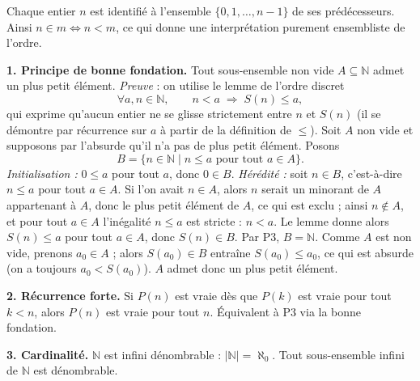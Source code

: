 Chaque entier $n$ est identifié à l'ensemble $\{0,1,\ldots,n-1\}$ de ses
prédécesseurs. Ainsi $n \in m \Leftrightarrow n < m$, ce qui donne une
interprétation purement ensembliste de l'ordre.

\decsep{}



\begin{mdframed}[style=exbar]
  \textbf{1. Principe de bonne fondation.}\enspace%
  Tout sous-ensemble non vide $A \subseteq \mathbb{N}$ admet un plus petit élément.
  \textit{Preuve} : on utilise le lemme de l'ordre discret
  \[
    \forall a,n\in\mathbb{N},\qquad n < a \;\Longrightarrow\; S(n) \leq a,
  \]
  qui exprime qu'aucun entier ne se glisse strictement entre $n$ et $S(n)$
  (il se démontre par récurrence sur $a$ à partir de la définition de $\leq$).
  Soit $A$ non vide et supposons par l'absurde qu'il n'a pas de plus petit
  élément. Posons
  \[
    B = \{n\in\mathbb{N} \mid n \leq a \text{ pour tout } a\in A\}.
  \]
  \emph{Initialisation :} $0 \leq a$ pour tout $a$, donc $0\in B$.
  \emph{Hérédité :} soit $n\in B$, c'est-à-dire $n\leq a$ pour tout $a\in A$.
  Si l'on avait $n\in A$, alors $n$ serait un minorant de $A$ appartenant à $A$,
  donc le plus petit élément de $A$, ce qui est exclu ; ainsi $n\notin A$,
  et pour tout $a\in A$ l'inégalité $n\leq a$ est stricte : $n<a$.
  Le lemme donne alors $S(n)\leq a$ pour tout $a\in A$, donc $S(n)\in B$.
  Par P3, $B = \mathbb{N}$. Comme $A$ est non vide, prenons $a_0\in A$ ;
  alors $S(a_0)\in B$ entraîne $S(a_0)\leq a_0$, ce qui est absurde
  (on a toujours $a_0 < S(a_0)$). $A$ admet donc un plus petit élément.

  \smallskip\noindent
  \textbf{2. Récurrence forte.}\enspace%
  Si $P(n)$ est vraie dès que $P(k)$ est vraie pour tout $k < n$,
  alors $P(n)$ est vraie pour tout $n$. Équivalent à P3 via la bonne fondation.

  \smallskip\noindent
  \textbf{3. Cardinalité.}\enspace%
  $\mathbb{N}$ est infini dénombrable : $|\mathbb{N}| = \aleph_0$.
  Tout sous-ensemble infini de $\mathbb{N}$ est dénombrable.
\end{mdframed}

\vspace{6pt}

